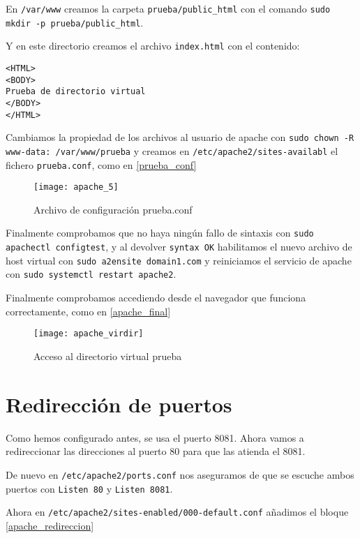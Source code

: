 En \verb|/var/www| creamos la carpeta \verb|prueba/public_html| con el comando \verb|sudo mkdir -p prueba/public_html|.

Y en este directorio creamos el archivo \verb|index.html| con el contenido:

\begin{verbatim}
<HTML>
<BODY>
Prueba de directorio virtual
</BODY>
</HTML>
\end{verbatim}

Cambiamos la propiedad de los archivos al usuario de apache con \verb|sudo chown -R www-data: /var/www/prueba| y creamos en \verb|/etc/apache2/sites-availabl| el fichero \verb|prueba.conf|, como en \eqref{prueba_conf}

\begin{figure}[h!]
\begin{center}
\caption{Archivo de configuración prueba.conf}
\label{prueba_conf}
\texttt{[image: apache\_5]}
\end{center}
\end{figure}

Finalmente comprobamos que no haya ningún fallo de sintaxis con \verb|sudo apachectl configtest|, y al devolver \verb|syntax OK|  habilitamos el nuevo archivo de host virtual con \verb|sudo a2ensite domain1.com| y reiniciamos el servicio de apache con \verb|sudo systemctl restart apache2|.

Finalmente comprobamos accediendo desde el navegador que funciona correctamente, como en \eqref{apache_final}

\begin{figure}[h!]
\begin{center}
\caption{Acceso al directorio virtual prueba}
\label{apache_final}
\texttt{[image: apache\_virdir]}
\end{center}
\end{figure}

\section{Redirección de puertos}

Como hemos configurado antes, se usa el puerto 8081. Ahora vamos a redireccionar las direcciones al puerto 80 para que las atienda el 8081.

De nuevo en \verb|/etc/apache2/ports.conf| nos aseguramos de que se escuche ambos puertos con \verb|Listen 80| y \verb|Listen 8081|.

Ahora en \verb|/etc/apache2/sites-enabled/000-default.conf| añadimos el bloque \eqref{apache_redireccion}

